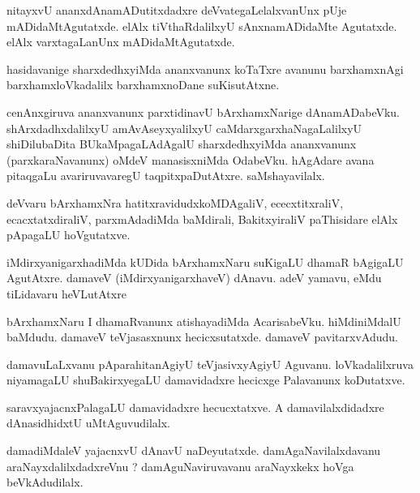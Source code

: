 \documentclass{article}
\begin{document}
\begin{mn}
nitayxvU  ananxdAnamADutitxdadxre  deVvategaLelalxvanUnx  pUje  mADidaMtAgutatxde.  
elAlx  tiVthaRdalilxyU  sAnxnamADidaMte  Agutatxde.  elAlx  varxtagaLanUnx  mADidaMtAgutatxde.
\end{mn}

\begin{mn}
hasidavanige  sharxdedhxyiMda  ananxvanunx  koTaTxre  avanunu  barxhamxnAgi  
barxhamxloVkadalilx  barxhamxnoDane  suKisutAtxne.
\end{mn}

\begin{mn}
cenAnxgiruva  ananxvanunx  parxtidinavU  bArxhamxNarige  dAnamADabeVku.  shArxdadhxdalilxyU  
amAvAseyxyalilxyU  caMdarxgarxhaNagaLalilxyU  shiDilubaDita  BUkaMpagaLAdAgalU  sharxdedhxyiMda  
ananxvanunx  (parxkaraNavanunx) oMdeV  manasisxniMda  OdabeVku.  hAgAdare  avana  
pitaqgaLu  avariruvavaregU  taqpitxpaDutAtxre.  saMshayavilalx.
\end{mn}

\begin{mn}
deVvaru  bArxhamxNra  hatitxravidudxkoMDAgaliV,  ececxtitxraliV,  ecacxtatxdiraliV,  
parxmAdadiMda  baMdirali,  BakitxyiraliV  paThisidare  elAlx  pApagaLU  hoVgutatxve.
\end{mn}

\begin{mn}
iMdirxyanigarxhadiMda  kUDida  bArxhamxNaru  suKigaLU  dhamaR  bAgigaLU  AgutAtxre.  
damaveV (iMdirxyanigarxhaveV)  dAnavu.  adeV  yamavu,  eMdu  tiLidavaru  heVLutAtxre
\end{mn}

\begin{mn}
bArxhamxNaru  I  dhamaRvanunx  atishayadiMda  AcarisabeVku.  hiMdiniMdalU  baMdudu.  
damaveV  teVjasasxnunx  hecicxsutatxde.  damaveV  pavitarxvAdudu.
\end{mn}

\begin{mn}
damavuLaLxvanu  pAparahitanAgiyU  teVjasivxyAgiyU  Aguvanu.  loVkadalilxruva  niyamagaLU  
shuBakirxyegaLU  damavidadxre  hecicxge  Palavanunx  koDutatxve.
\end{mn}

\begin{mn}
saravxyajacnxPalagaLU  damavidadxre  hecucxtatxve.  A  damavilalxdidadxre  dAnasidhidxtU  uMtAguvudilalx.
\end{mn}

\begin{mn}
damadiMdaleV  yajacnxvU  dAnavU  naDeyutatxde.  damAgaNavilalxdavanu  araNayxdalilxdadxreVnu ?  
damAguNaviruvavanu  araNayxkekx  hoVga  beVkAdudilalx.  
\end{mn}
\end{document}
